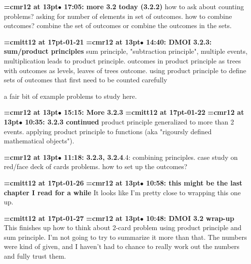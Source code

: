 {\smallskip\noindent\bf\font\titlefont=cmr12 at 13pt\titlefont $\bullet$ 17:05: more 3.2 today (3.2.2)}\smallskip
how to ask about counting problems? asking for number of elements in set of outcomes. how to combine outcomes? combine the set of outcomes or combine the outcomes in the sets.
\par

{\medskip\noindent\bf\font\titlefont=cmitt12 at 17pt-01-21}\medskip
{\smallskip\noindent\bf\font\titlefont=cmr12 at 13pt\titlefont $\bullet$ 14:40: DMOI 3.2.3: sum/product principles}\smallskip
sum principle, "subtraction principle", multiple events, multiplication leads to product principle. outcomes in product principle as trees with outcomes as levels, leaves of trees outcome. using product principle to define sets of outcomes that first need to be counted carefully
\par

a fair bit of example problems to study here.
\par

{\smallskip\noindent\bf\font\titlefont=cmr12 at 13pt\titlefont $\bullet$ 15:15: More 3.2.3}\smallskip
{\medskip\noindent\bf\font\titlefont=cmitt12 at 17pt-01-22}\medskip
{\smallskip\noindent\bf\font\titlefont=cmr12 at 13pt\titlefont $\bullet$ 10:35: 3.2.3 continued}\smallskip
product principle generalized to more than 2 events. applying product principle to functions (aka "rigoursly defined mathematical objects").
\par

{\smallskip\noindent\bf\font\titlefont=cmr12 at 13pt\titlefont $\bullet$ 11:18: 3.2.3, 3.2.4}.4: combining principles. case study on red/face deck of cards problems. how to set up the outcomes?
\par

{\medskip\noindent\bf\font\titlefont=cmitt12 at 17pt-01-26}\medskip
{\smallskip\noindent\bf\font\titlefont=cmr12 at 13pt\titlefont $\bullet$ 10:58: this might be the last chapter I read for a while}\smallskip
It looks like I'm pretty close to wrapping this one up.
\par

{\medskip\noindent\bf\font\titlefont=cmitt12 at 17pt-01-27}\medskip
{\smallskip\noindent\bf\font\titlefont=cmr12 at 13pt\titlefont $\bullet$ 10:48: DMOI 3.2 wrap-up}\smallskip
This finishes up how to think about 2-card problem using product principle and sum principle. I'm not going to try to summarize it more than that. The numbers were kind of given, and I haven't had to chance to really work out the numbers and fully trust them.
\par

